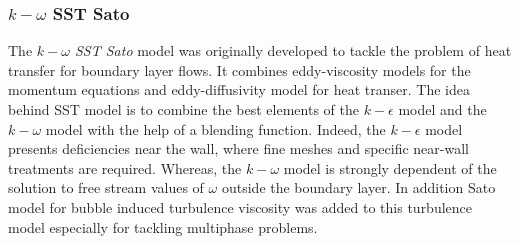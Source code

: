 \documentclass[11pt,a4paper]{article}
\begin{document}
\subsubsection{$k-\omega$ SST Sato}
The \textit{$k-\omega$ SST Sato} model \citep{SSTSato} was originally developed to tackle the problem of heat transfer for boundary layer flows. It combines eddy-viscosity models for the momentum equations and eddy-diffusivity model for heat transer. The idea behind SST model is to combine the best elements of the $k-\epsilon$ model and the $k-\omega$ model with the help of a blending function. Indeed, the $k-\epsilon$ model presents deficiencies near the wall, where fine meshes and specific near-wall treatments are required. Whereas, the $k-\omega$ model is strongly dependent of the solution to free stream values of $\omega$ outside the boundary layer. In addition Sato \cite{sato} model for bubble induced turbulence viscosity was added to this turbulence model especially for tackling multiphase problems.\\
%
\end{document}
